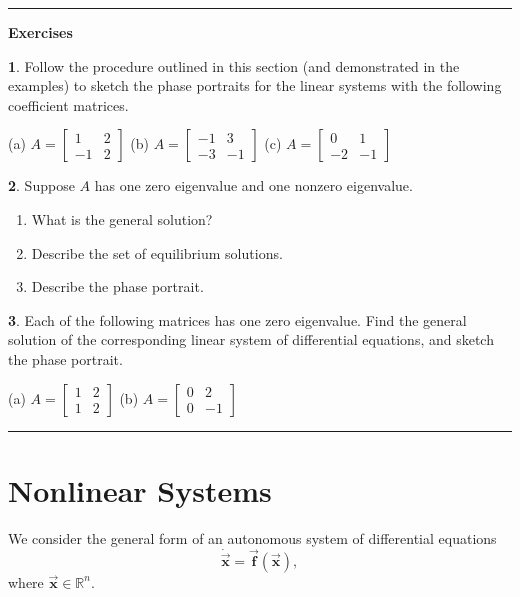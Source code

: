 \documentclass[reqno]{immbook}
\newcommand{\Real}{\mathbb{R}}
\newcommand{\BF}{\vec{\textbf{f}}}
\newcommand{\BX}{\vec{\textbf{x}}}
\newcommand{\ds}{\displaystyle}
\numberwithin{equation}{chapter}
\numberwithin{question}{section}
\numberwithin{theorem}{chapter}
\numberwithin{figure}{chapter}
\theoremstyle{definition}
\newtheorem{exercise}{}[section]
\newenvironment{exercises}%
{%
\medskip\hrule\medskip\noindent\textbf{Exercises}%
}%
{%
\medskip\hrule
}
\begin{document}
\begin{exercises}
\begin{exercise}
Follow the procedure outlined in this section (and demonstrated
in the examples) to sketch the phase portraits for the linear
systems with the following coefficient matrices.

\smallskip
(a) $\ds A = \begin{bmatrix} 1 & 2 \\ -1 & 2 \end{bmatrix}$
\hspace{1cm}
(b) $\ds A = \begin{bmatrix} -1 & 3 \\ -3 & -1 \end{bmatrix}$
\hspace{1cm}
(c) $\ds A = \begin{bmatrix} 0 & 1 \\ -2 & -1 \end{bmatrix}$ 
\end{exercise}
\begin{exercise}
Suppose $A$ has one zero eigenvalue and one nonzero eigenvalue.
\begin{enumerate}
\item[(a)] What is the general solution?
\item[(b)] Describe the set of equilibrium solutions.
\item[(c)] Describe the phase portrait.
\end{enumerate}
\end{exercise}
\begin{exercise}
Each of the following matrices has one zero eigenvalue.
Find the general solution of the corresponding linear system of
differential equations, and sketch the phase portrait.

\smallskip
(a) $\ds A = \begin{bmatrix} 1 & 2 \\ 1 & 2 \end{bmatrix}$
\hspace{1cm}
(b) $\ds A = \begin{bmatrix} 0 & 2 \\ 0 & -1 \end{bmatrix}$
\end{exercise}
\end{exercises}
%
%
\section{Nonlinear Systems}
We consider the general form of an autonomous
system of differential equations
\begin{equation}
   \dot{\BX} = \BF\left(\BX\right),
   \label{eqn:NONLIN}
\end{equation}
where $\BX \in \Real^{n}$.
\end{document}

